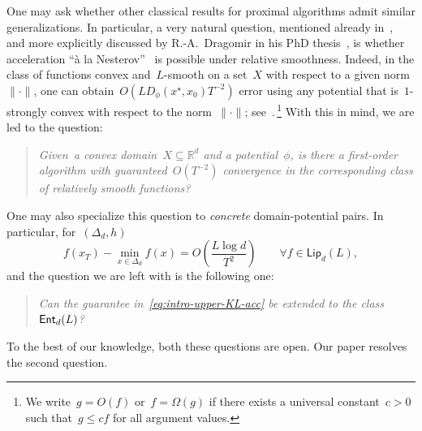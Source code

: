 \documentclass[11pt]{article}
\numberwithin{equation}{section}
\let\le\leqslant
\theoremstyle{remark}
\newcommand{\R}{\mathbb{R}}
\newcommand{\Ent}{\textup{\textsf{Ent}}}
\newcommand{\Fh}{\Ent_d}
\newcommand{\Vh}{\textsf{Lip}_d}
\newcommand{\Simp}{\Delta_d}
\newcommand{\1}{\mathbf{1}}
\begin{document}
One may ask whether other classical results for proximal algorithms admit similar generalizations. 
In particular, a very natural question, mentioned already in~\cite{BauschkeBolteTeboulle2017},~\cite{LuFreundNesterov2018} and more explicitly discussed by R.-A.~Dragomir in his PhD thesis~\cite{DragomirThesis2021}, is whether acceleration ``\`a la Nesterov''~\cite{nesterov1983method} is possible under relative smoothness.  
Indeed, in the class of functions convex and~$L$-smooth on a set~$X$ with respect to a given norm~$\|\cdot\|$, 
one can obtain~$O(LD_{\phi}(x^\star,x_0)T^{-2})$ error using any potential that is~$1$-strongly convex with respect to the norm~$\|\cdot\|$; see~\cite{nesterov2013first}.\,\footnote{We write~$g = O(f)$ or~$f = \Omega(g)$ if there exists a universal constant~$c > 0$ such that~$g \le cf$ for all argument values.}
With this in mind, we are led to the question:
\begin{quote}
{\em
Given~a convex domain~$X \subseteq \R^d$ and a potential~$\phi$,  is there a first-order algorithm with guaranteed~$O(T^{-2})$ convergence in the corresponding class of relatively smooth functions?
\em}
\end{quote}
One may also specialize this question to {\em concrete} domain-potential pairs. 
In particular, for~$(\Simp,h)$
\begin{equation}
\label{eq:intro-upper-KL-acc}
f(x_T)- \min_{x \in \Simp} f(x) = O\left(\frac{L\log d}{T^2}\right) \qquad \forall f \in \Vh(L),
\end{equation}
and the question we are left with is the following one:
\begin{mdframed}
\begin{quote}
\begin{center}
{\em
Can the guarantee in~\eqref{eq:intro-upper-KL-acc} be extended to the class~$\Fh(L)$?
\em}
\end{center}
\end{quote}
\end{mdframed}
To the best of our knowledge, both these questions are open.
Our paper resolves the second question.
\end{document}
